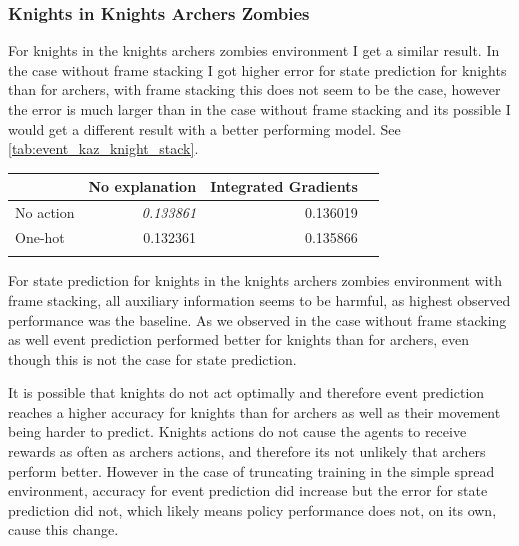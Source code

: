 \documentclass[UKenglish]{uiomasterthesis}
\begin{document}
\subsubsection{Knights in Knights Archers Zombies}

For knights in the knights archers zombies environment I get a similar result. In the case without frame stacking I got higher error for state prediction for knights than for archers, with frame stacking this does not seem to be the case, however the error is much larger than in the case without frame stacking and its possible I would get a different result with a better performing model. See \cref{tab:event_kaz_knight_stack}.

\begin{center}
\label{tab:event_kaz_knight_stack}
\begin{tabular}{lrrr}
\toprule
 & No explanation & Integrated Gradients \\
\midrule
No action & \textit{0.133861} & 0.136019 \\
One-hot & 0.132361 & 0.135866 \\
\bottomrule
\addlinespace[2pt]
\multicolumn{3}{l}{\textsuperscript{***}$p<0.001$, 
  \textsuperscript{**}$p<0.01$, 
  \textsuperscript{*}$p<0.05$}
\end{tabular}
\end{center}

For state prediction for knights in the knights archers zombies environment with frame stacking, all auxiliary information seems to be harmful, as highest observed performance was the baseline. As we observed in the case without frame stacking as well event prediction performed better for knights than for archers, even though this is not the case for state prediction. 

It is possible that knights do not act optimally and therefore event prediction reaches a higher accuracy for knights than for archers as well as their movement being harder to predict. Knights actions do not cause the agents to receive rewards as often as archers actions, and therefore its not unlikely that archers perform better. However in the case of truncating training in the simple spread environment, accuracy for event prediction did increase but the error for state prediction did not, which likely means policy performance does not, on its own, cause this change.
\end{document}
